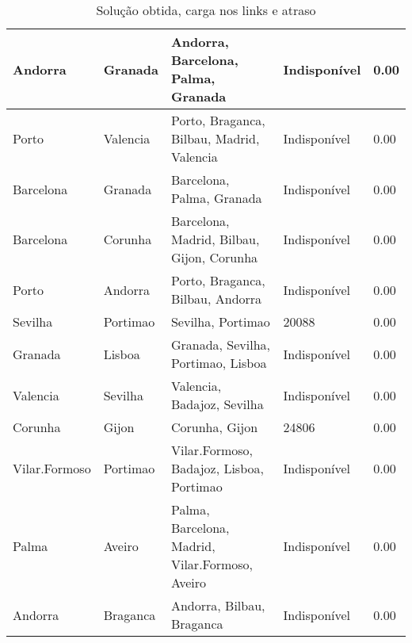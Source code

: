 \begin{table}[!htb]
{\begin{tabular}{|l|l|l|l|l|}
Andorra & Granada & Andorra, Barcelona, Palma, Granada & Indisponível & 0.00 \\ \hline
Porto & Valencia & Porto, Braganca, Bilbau, Madrid, Valencia & Indisponível & 0.00 \\ \hline
Barcelona & Granada & Barcelona, Palma, Granada & Indisponível & 0.00 \\ \hline
Barcelona & Corunha & Barcelona, Madrid, Bilbau, Gijon, Corunha & Indisponível & 0.00 \\ \hline
Porto & Andorra & Porto, Braganca, Bilbau, Andorra & Indisponível & 0.00 \\ \hline
Sevilha & Portimao & Sevilha, Portimao & 20088 & 0.00 \\ \hline
Granada & Lisboa & Granada, Sevilha, Portimao, Lisboa & Indisponível & 0.00 \\ \hline
Valencia & Sevilha & Valencia, Badajoz, Sevilha & Indisponível & 0.00 \\ \hline
Corunha & Gijon & Corunha, Gijon & 24806 & 0.00 \\ \hline
Vilar.Formoso & Portimao & Vilar.Formoso, Badajoz, Lisboa, Portimao & Indisponível & 0.00 \\ \hline
Palma & Aveiro & Palma, Barcelona, Madrid, Vilar.Formoso, Aveiro & Indisponível & 0.00 \\ \hline
Andorra & Braganca & Andorra, Bilbau, Braganca & Indisponível & 0.00 \\ \hline
\end{tabular}}
\caption[]{Solução obtida, carga nos links e atraso}
\end{table}

\begin{table}[!htb]
        \centering
\caption[]{Solução obtida, carga nos links e atraso}
\end{table}

